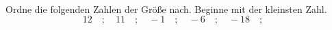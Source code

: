 \begin{aufgabe} ~ \\ 
Ordne die folgenden Zahlen der Gr\"o\ss{}e nach. Beginne mit der kleinsten Zahl.\[12\quad ; \quad11\quad ; \quad-1\quad ; \quad-6\quad ; \quad-18\quad ; \quad\]\end{aufgabe} 
